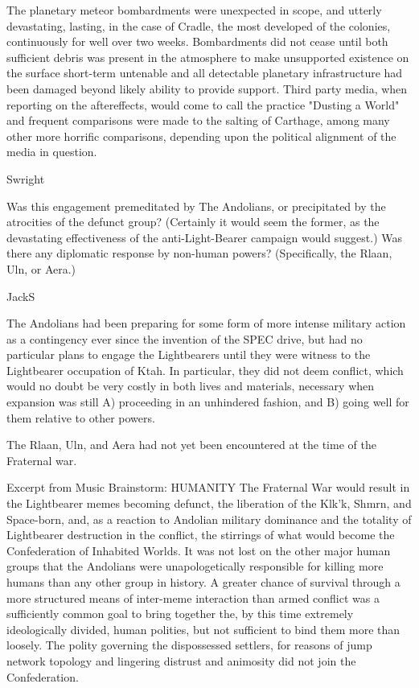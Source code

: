 The planetary meteor bombardments were unexpected in scope, and
utterly devastating, lasting, in the case of Cradle, the most
developed of the colonies, continuously for well over two
weeks. Bombardments did not cease until both sufficient debris was
present in the atmosphere to make unsupported existence on the surface
short-term untenable and all detectable planetary infrastructure had
been damaged beyond likely ability to provide support. Third party
media, when reporting on the aftereffects, would come to call the
practice "Dusting a World" and frequent comparisons were made to the
salting of Carthage, among many other more horrific comparisons,
depending upon the political alignment of the media in question.

Swright

Was this engagement premeditated by The Andolians, or precipitated by
the atrocities of the defunct group? (Certainly it would seem the
former, as the devastating effectiveness of the anti-Light-Bearer
campaign would suggest.) Was there any diplomatic response by
non-human powers? (Specifically, the Rlaan, Uln, or Aera.)

JackS

The Andolians had been preparing for some form of more intense
military action as a contingency ever since the invention of the SPEC
drive, but had no particular plans to engage the Lightbearers until
they were witness to the Lightbearer occupation of Ktah. In
particular, they did not deem conflict, which would no doubt be very
costly in both lives and materials, necessary when expansion was still
A) proceeding in an unhindered fashion, and B) going well for them
relative to other powers.
 
The Rlaan, Uln, and Aera had not yet been encountered at the time of
the Fraternal war.

Excerpt from Music Brainstorm: HUMANITY The Fraternal War would result
in the Lightbearer memes becoming defunct, the liberation of the
Klk'k, Shmrn, and Space-born, and, as a reaction to Andolian military
dominance and the totality of Lightbearer destruction in the conflict,
the stirrings of what would become the Confederation of Inhabited
Worlds. It was not lost on the other major human groups that the
Andolians were unapologetically responsible for killing more humans
than any other group in history. A greater chance of survival through
a more structured means of inter-meme interaction than armed conflict
was a sufficiently common goal to bring together the, by this time
extremely ideologically divided, human polities, but not sufficient to
bind them more than loosely. The polity governing the dispossessed
settlers, for reasons of jump network topology and lingering distrust
and animosity did not join the Confederation.

